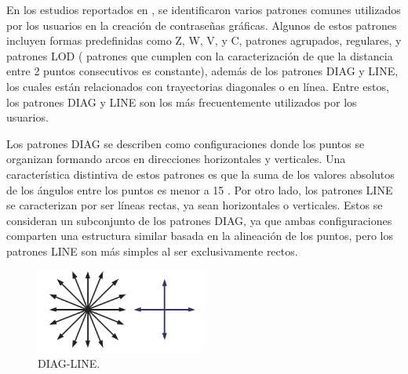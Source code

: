 \documentclass[12pt]{report}
\begin{document}
En los estudios reportados en \cite{5,20,21,22,23,24,25}, se identificaron varios patrones comunes utilizados por los usuarios en la creación de contraseñas gráficas. Algunos de estos patrones incluyen formas predefinidas como Z, W, V, y C, patrones agrupados, regulares, y patrones LOD ( patrones que cumplen con la caracterización de que la distancia entre 2 puntos consecutivos es constante), además de los patrones DIAG y LINE, los cuales están relacionados con trayectorias diagonales o en línea. Entre estos, los patrones DIAG y LINE son los más frecuentemente utilizados por los usuarios.

Los patrones DIAG se describen como configuraciones donde los puntos se organizan formando arcos en direcciones horizontales y verticales. Una característica distintiva de estos patrones es que la suma de los valores absolutos de los ángulos entre los puntos es menor a 15 \degree. Por otro lado, los patrones LINE se caracterizan por ser líneas rectas, ya sean horizontales o verticales. Estos se consideran un subconjunto de los patrones DIAG, ya que ambas configuraciones comparten una estructura similar basada en la alineación de los puntos, pero los patrones LINE son más simples al ser exclusivamente rectos.

\begin{figure}[ht]
	\centering
	\includegraphics[width=0.5\textwidth]{DIAG_LINE.png}
	\caption{DIAG-LINE.}
	\label{fig:DIAG_LINE}
\end{figure}


\end{document}
